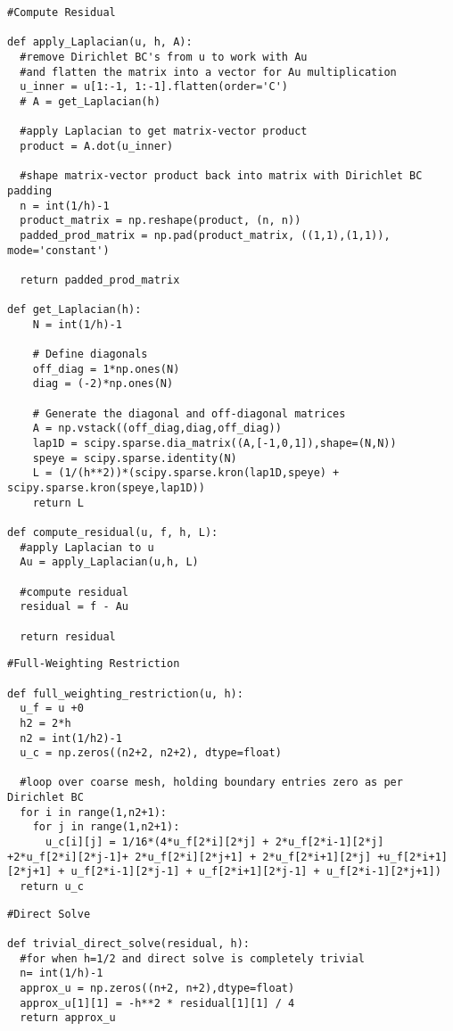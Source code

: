 \documentclass[12pt]{article}
\begin{document}
\begin{verbatim}
#Compute Residual

def apply_Laplacian(u, h, A):
  #remove Dirichlet BC's from u to work with Au
  #and flatten the matrix into a vector for Au multiplication
  u_inner = u[1:-1, 1:-1].flatten(order='C')
  # A = get_Laplacian(h)

  #apply Laplacian to get matrix-vector product
  product = A.dot(u_inner)

  #shape matrix-vector product back into matrix with Dirichlet BC padding
  n = int(1/h)-1
  product_matrix = np.reshape(product, (n, n))
  padded_prod_matrix = np.pad(product_matrix, ((1,1),(1,1)), mode='constant')

  return padded_prod_matrix

def get_Laplacian(h):
    N = int(1/h)-1

    # Define diagonals
    off_diag = 1*np.ones(N)
    diag = (-2)*np.ones(N)

    # Generate the diagonal and off-diagonal matrices
    A = np.vstack((off_diag,diag,off_diag))
    lap1D = scipy.sparse.dia_matrix((A,[-1,0,1]),shape=(N,N))
    speye = scipy.sparse.identity(N)
    L = (1/(h**2))*(scipy.sparse.kron(lap1D,speye) + scipy.sparse.kron(speye,lap1D))
    return L

def compute_residual(u, f, h, L):
  #apply Laplacian to u
  Au = apply_Laplacian(u,h, L)

  #compute residual
  residual = f - Au

  return residual
\end{verbatim}
\newpage
\begin{verbatim}
#Full-Weighting Restriction

def full_weighting_restriction(u, h):
  u_f = u +0
  h2 = 2*h
  n2 = int(1/h2)-1
  u_c = np.zeros((n2+2, n2+2), dtype=float)

  #loop over coarse mesh, holding boundary entries zero as per Dirichlet BC
  for i in range(1,n2+1):
    for j in range(1,n2+1):
      u_c[i][j] = 1/16*(4*u_f[2*i][2*j] + 2*u_f[2*i-1][2*j] +2*u_f[2*i][2*j-1]+ 2*u_f[2*i][2*j+1] + 2*u_f[2*i+1][2*j] +u_f[2*i+1][2*j+1] + u_f[2*i-1][2*j-1] + u_f[2*i+1][2*j-1] + u_f[2*i-1][2*j+1])
  return u_c
\end{verbatim}

\begin{verbatim}
#Direct Solve

def trivial_direct_solve(residual, h):
  #for when h=1/2 and direct solve is completely trivial
  n= int(1/h)-1
  approx_u = np.zeros((n+2, n+2),dtype=float)
  approx_u[1][1] = -h**2 * residual[1][1] / 4
  return approx_u
\end{verbatim}
\end{document}
